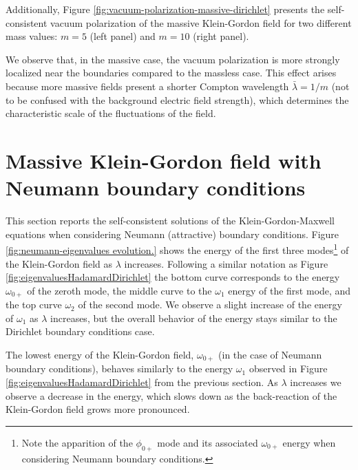 Additionally, Figure \ref{fig:vacuum-polarization-massive-dirichlet} presents the self-consistent vacuum polarization of the massive Klein-Gordon field for two different mass values: $m=5$ (left panel) and $m=10$ (right panel). 

 We observe that, in the massive case, the vacuum polarization is more strongly localized near the boundaries compared to the massless case.
 This effect arises  because more massive fields present a shorter Compton wavelength $\bar{\lambda} = 1/m$ (not to be confused with the background electric field strength), which  determines the characteristic scale of the fluctuations of the field.
\section{Massive Klein-Gordon field with Neumann boundary conditions}

This section reports the self-consistent solutions of the Klein-Gordon-Maxwell equations when considering Neumann (attractive) boundary conditions. Figure \ref{fig:neumann-eigenvalues evolution.} shows the energy of the first three modes\footnote{Note the apparition of the $\phi_{0+}$ mode and its associated $\omega_{0+}$ energy when considering Neumann boundary conditions.} of the Klein-Gordon field as $\lambda$ increases. Following a similar notation as Figure \ref{fig:eigenvaluesHadamardDirichlet} the bottom curve corresponds to the energy $\omega_{0+}$ of the zeroth mode, the middle curve to the $\omega_1$ energy of the first mode, and the top curve $\omega_2$ of the second mode. We observe a slight increase of the energy of $\omega_1$ as $\lambda$ increases, but the overall behavior of the energy stays similar to the Dirichlet boundary conditions case.

The lowest energy of the Klein-Gordon field, $\omega_{0+}$ (in the case of Neumann boundary conditions), behaves similarly to the  energy $\omega_1$ observed in Figure \ref{fig:eigenvaluesHadamardDirichlet} from the previous section.  As $\lambda$ increases we observe a decrease in the energy, which slows down as the back-reaction of the Klein-Gordon field grows more pronounced.

